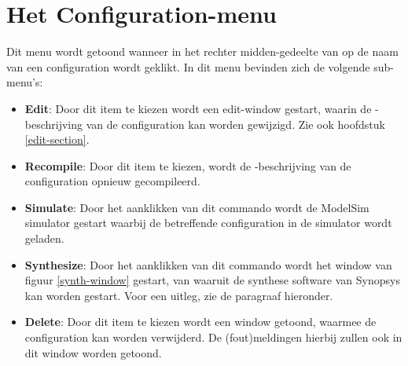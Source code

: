 \section{Het Configuration-menu}
Dit menu wordt getoond wanneer in het rechter midden-gedeelte van 
op de naam van een configuration wordt geklikt.
In dit menu bevinden zich de volgende sub-menu's:
\begin{itemize}
\item {\bf Edit}: Door dit item te kiezen wordt een edit-window gestart, waarin de
             -beschrijving van de configuration kan worden gewijzigd.
Zie ook hoofdstuk \ref{edit-section}.
\item {\bf Recompile}: Door dit item te kiezen, wordt de -beschrijving van
                  de  configuration opnieuw gecompileerd.
\item {\bf Simulate}: Door het aanklikken van dit commando wordt de ModelSim simulator
               gestart waarbij de betreffende configuration in de simulator
               wordt geladen.
\item {\bf Synthesize}: Door het aanklikken van dit commando wordt het window van
	figuur \ref{synth-window} gestart, van waaruit de synthese
	software van Synopsys kan worden gestart.
	Voor een uitleg, zie de paragraaf hieronder.
\item {\bf Delete}: Door dit item te kiezen wordt een window getoond, waarmee de
             configuration kan worden verwijderd. De (fout)meldingen hierbij
             zullen ook in dit window worden getoond.
\end{itemize}

